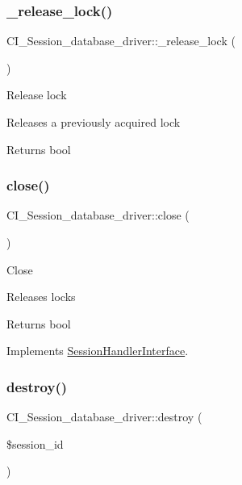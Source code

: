 \subsubsection{\texorpdfstring{\+\_\+release\+\_\+lock()}{\_release\_lock()}}
{\footnotesize\ttfamily C\+I\+\_\+\+Session\+\_\+database\+\_\+driver\+::\+\_\+release\+\_\+lock (\begin{DoxyParamCaption}{ }\end{DoxyParamCaption})\hspace{0.3cm}{\ttfamily [protected]}}

Release lock

Releases a previously acquired lock

\begin{DoxyReturn}{Returns}
bool 
\end{DoxyReturn}
\mbox{\label{class_c_i___session__database__driver_a371a8fd53fbc3e522b862677678bc99c}} 
\subsubsection{\texorpdfstring{close()}{close()}}
{\footnotesize\ttfamily C\+I\+\_\+\+Session\+\_\+database\+\_\+driver\+::close (\begin{DoxyParamCaption}{ }\end{DoxyParamCaption})}

Close

Releases locks

\begin{DoxyReturn}{Returns}
bool 
\end{DoxyReturn}


Implements \mbox{\hyperlink{interface_session_handler_interface}{Session\+Handler\+Interface}}.

\mbox{\label{class_c_i___session__database__driver_a7e820c391e772eca26afffe2a841ee8c}} 
\subsubsection{\texorpdfstring{destroy()}{destroy()}}
{\footnotesize\ttfamily C\+I\+\_\+\+Session\+\_\+database\+\_\+driver\+::destroy (\begin{DoxyParamCaption}\item[{}]{\$session\+\_\+id }\end{DoxyParamCaption})}

